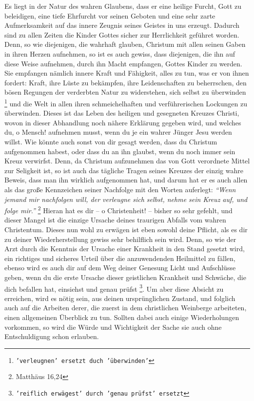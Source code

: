 Es liegt in der Natur des wahren Glaubens, dass er eine heilige Furcht, Gott zu
beleidigen, eine tiefe Ehrfurcht vor seinen Geboten und eine sehr zarte
Aufmerksamkeit auf das innere Zeugnis seines Geistes in uns erzeugt. Dadurch
sind zu allen Zeiten die Kinder Gottes sicher zur Herrlichkeit geführet worden.
Denn, so wie diejenigen, die wahrhaft glauben, Christum mit allen seinen Gaben
in ihren Herzen aufnehmen, so ist es auch gewiss, dass diejenigen, die ihn auf
diese Weise aufnehmen, durch ihn Macht empfangen, Gottes Kinder zu werden. Sie
empfangen nämlich innere Kraft und Fähigkeit, alles zu tun, was er von ihnen
fordert: Kraft, ihre Lüste zu bekämpfen, ihre Leidenschaften zu beherrschen, den
bösen Regungen der verderbten Natur zu widerstehen, sich selbst zu überwinden 
\footnote{\texttt{'verleugnen' ersetzt duch 'überwinden'}}
und die Welt in allen ihren schmeichelhaften und verführerischen Lockungen zu
überwinden. Dieses ist das Leben des heiligen und gesegneten Kreuzes Christi,
wovon in dieser Abhandlung noch nähere Erklärung gegeben wird, und welches du, o
Mensch! aufnehmen musst, wenn du je ein wahrer Jünger Jesu werden willst. Wie
könnte auch sonst von dir gesagt werden, dass du Christum aufgenommen habest,
oder dass du an ihn glaubst, wenn du noch immer sein Kreuz verwirfst. Denn, da
Christum aufzunehmen das von Gott verordnete Mittel zur Seligkeit ist, so ist
auch das tägliche Tragen seines Kreuzes der einzig wahre Beweis, dass man ihn
wirklich aufgenommen hat, und darum hat er es auch allen als das große
Kennzeichen seiner Nachfolge mit den Worten auferlegt:
\textit{"`Wenn jemand mir nachfolgen will, der verleugne sich selbst, nehme sein
Kreuz auf, und folge mir."'}
\footnote{Matthäus 16,24}
Hieran hat es dir -- o Christenheit! -- bisher so sehr gefehlt, und dieser
Mangel ist die einzige Ursache deines traurigen Abfalls vom wahren Christentum. Dieses
nun wohl zu erwägen ist eben sowohl deine Pflicht, als es dir zu deiner
Wiederherstellung gewiss sehr behilflich sein wird. Denn, so wie der Arzt durch
die Kenntnis der Ursache einer Krankheit in den Stand gesetzt wird, ein
richtiges und sicheres Urteil über die anzuwendenden Heilmittel zu fällen, ebenso 
wird es auch dir auf dem Weg deiner Genesung Licht und Aufschlüsse geben,
wenn du die erste Ursache dieser geistlichen Krankheit und Schwäche, die dich
befallen hat, einsiehst und genau prüfst
\footnote{\texttt{'reiflich erwägest' durch 'genau prüfst' ersetzt}}.
Um aber diese Absicht zu
erreichen, wird es nötig sein, aus deinen ursprünglichen Zustand, und folglich
auch auf die Arbeiten derer, die zuerst in dem christlichen Weinberge
arbeiteten, einen allgemeinen Überblick zu tun. Sollten dabei auch einige
Wiederholungen vorkommen, so wird die Würde und Wichtigkeit der Sache sie auch
ohne Entschuldigung schon erlauben.

